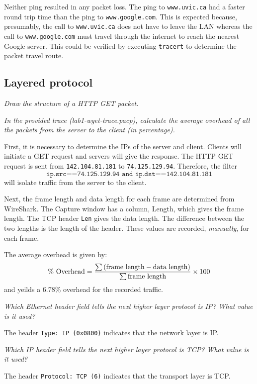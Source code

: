


Neither ping resulted in any packet loss.
The ping to \verb|www.uvic.ca| had a faster round trip time than the ping to \verb|www.google.com|.
This is expected because, presumably, the call to \verb|www.uvic.ca| does not have to leave the LAN whereas the call to \verb|www.google.com| must travel through the internet to reach the nearest Google server.
This could be verified by executing \texttt{tracert} to determine the packet travel route.

\subsection{Layered protocol}\label{sec:protocol}

\textit{Draw the structure of a HTTP GET packet.}



\textit{In the provided trace (lab1-wget-trace.pacp), calculate the average overhead of all the packets from the server to the client (in percentage).}

First, it is necessary to determine the IPs of the server and client.
Clients will initiate a GET request and servers will give the response.
The HTTP GET request is sent from \texttt{142.104.81.181} to \texttt{74.125.129.94}.
Therefore, the filter \[\texttt{ip.src==74.125.129.94 and ip.dst==142.104.81.181}\] will isolate traffic from the server to the client.

Next, the frame length and data length for each frame are determined from WireShark.
The Capture window has a column, Length, which gives the frame length.
The TCP header \texttt{Len} gives the data length.
The difference between the two lengths is the length of the header.
These values are recorded, \emph{manually}, for each frame.

The average overhead is given by:
\begin{equation*}
	\text{\% Overhead} = { \sum \left( \text{frame length} -  \text{data length} \right) \over \sum \text{frame length} } \times 100
\end{equation*}
and yeilds a 6.78\% overhead for the recorded traffic.

\newpage
\textit{Which Ethernet header field tells the next higher layer protocol is IP? What value is it used?}

The header \texttt{Type: IP (0x0800)} indicates that the network layer is IP.

\textit{Which IP header field tells the next higher layer protocol is TCP? What value is it used?}

The header \texttt{Protocol: TCP (6)} indicates that the transport layer is TCP.
